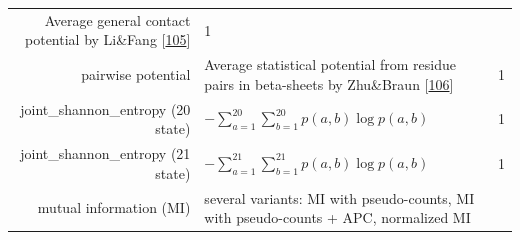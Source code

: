 \documentclass[12pt,a4paper,twoside]{book}
\theoremstyle{definition}
\theoremstyle{definition}
\theoremstyle{remark}
\begin{document}
\begin{longtable}[]{@{}rlc@{}}
\begin{minipage}[t]{0.50\columnwidth}
Average general contact potential by Li\&Fang
{[}\protect\hyperlink{ref-Li2011}{105}{]}\strut
\end{minipage} & \begin{minipage}[t]{0.18\columnwidth}\centering\strut
1\strut
\end{minipage}\tabularnewline
\begin{minipage}[t]{0.23\columnwidth}\raggedleft\strut
pairwise potential\strut
\end{minipage} & \begin{minipage}[t]{0.50\columnwidth}\raggedright\strut
Average statistical potential from residue pairs in beta-sheets by
Zhu\&Braun {[}\protect\hyperlink{ref-Zhu1999}{106}{]}\strut
\end{minipage} & \begin{minipage}[t]{0.18\columnwidth}\centering\strut
1\strut
\end{minipage}\tabularnewline
\begin{minipage}[t]{0.23\columnwidth}\raggedleft\strut
joint\_shannon\_entropy (20 state)\strut
\end{minipage} & \begin{minipage}[t]{0.50\columnwidth}\raggedright\strut
\(- \sum_{a=1}^{20}\sum_{b=1}^{20} p(a,b) \log p(a,b)\)\strut
\end{minipage} & \begin{minipage}[t]{0.18\columnwidth}\centering\strut
1\strut
\end{minipage}\tabularnewline
\begin{minipage}[t]{0.23\columnwidth}\raggedleft\strut
joint\_shannon\_entropy (21 state)\strut
\end{minipage} & \begin{minipage}[t]{0.50\columnwidth}\raggedright\strut
\(- \sum_{a=1}^{21}\sum_{b=1}^{21} p(a,b) \log p(a,b)\)\strut
\end{minipage} & \begin{minipage}[t]{0.18\columnwidth}\centering\strut
1\strut
\end{minipage}\tabularnewline
\begin{minipage}[t]{0.23\columnwidth}\raggedleft\strut
mutual information (MI)\strut
\end{minipage} & \begin{minipage}[t]{0.50\columnwidth}\raggedright\strut
several variants: MI with pseudo-counts, MI with pseudo-counts + APC,
normalized MI\strut
\end{minipage} & \begin{minipage}[t]{0.18\columnwidth}\centering\strut

\end{minipage}
\end{longtable}
\end{document}

